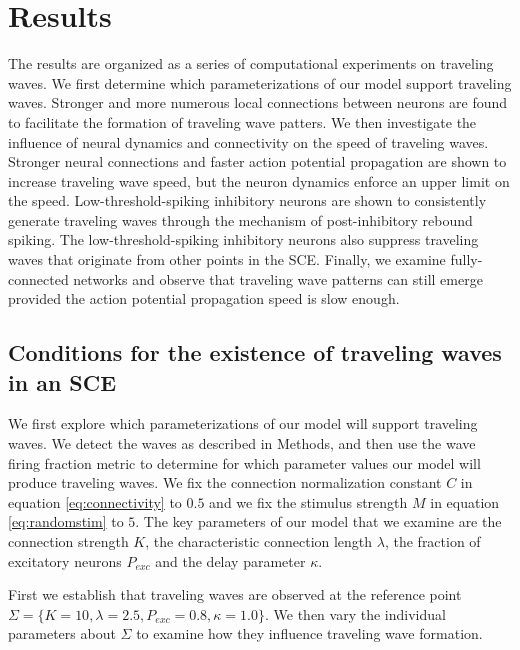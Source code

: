 \documentclass[12pt]{article}
\begin{document}
\section{Results}
The results are organized as a series of computational experiments on traveling waves.
We first determine which parameterizations of our model support traveling waves.
Stronger and more numerous local connections between neurons are found to facilitate the formation of traveling wave patters.
We then investigate the influence of neural dynamics and connectivity on the speed of traveling waves.
Stronger neural connections and faster action potential propagation are shown to increase traveling wave speed, but the neuron dynamics enforce an upper limit on the speed. 
Low-threshold-spiking inhibitory neurons are shown to consistently generate traveling waves through the mechanism of post-inhibitory rebound spiking.
The low-threshold-spiking inhibitory neurons also suppress traveling waves that originate from other points in the SCE.
Finally, we examine fully-connected networks and observe that traveling wave patterns can still emerge provided the action potential propagation speed is slow enough.

\subsection{Conditions for the existence of traveling waves in an SCE} \label{sub:waves}
We first explore which parameterizations of our model will support traveling waves.
We detect the waves as described in Methods, and then use the wave firing fraction metric to determine for which parameter values our model will produce traveling waves.
We fix the connection normalization constant $C$ in equation \ref{eq:connectivity} to $0.5$ and we fix the stimulus strength $M$ in equation \ref{eq:randomstim} to $5$.
The key parameters of our model that we examine are the connection strength $K$, the characteristic connection length $\lambda$, the fraction of excitatory neurons $P_{exc}$ and the delay parameter $\kappa$.

First we establish that traveling waves are observed at the \color{red}reference \color{black} point $\Sigma = \{K=10,\lambda=2.5,P_{exc}=0.8,\kappa=1.0 \}$.
We then vary the individual parameters about $\Sigma$ to examine how they influence traveling wave formation.
\end{document}
